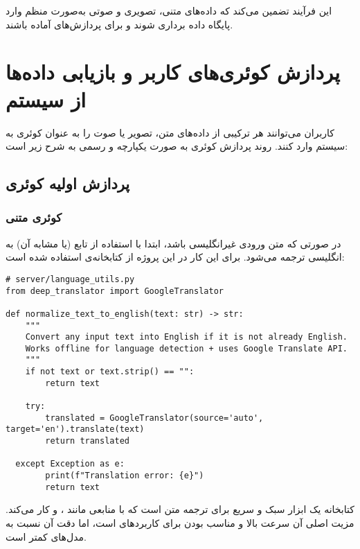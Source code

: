 \documentclass{article}
\begin{document}
این فرآیند تضمین می‌کند که داده‌های متنی، تصویری و صوتی به‌صورت منظم وارد پایگاه داده برداری شوند و برای پردازش‌های  آماده باشند.


\section{پردازش کوئری‌های کاربر و بازیابی داده‌ها از سیستم}

کاربران می‌توانند هر ترکیبی از داده‌های متن، تصویر یا صوت را به عنوان کوئری به سیستم وارد کنند.
روند پردازش کوئری به صورت یکپارچه و رسمی به شرح زیر است:

\subsection{پردازش اولیه کوئری}


\subsubsection{کوئری متنی}
در صورتی که متن ورودی غیرانگلیسی باشد، ابتدا با استفاده از تابع  (یا مشابه آن) به انگلیسی ترجمه می‌شود.
برای این کار در این پروژه از کتابخانه‌ی  استفاده شده است:

\begin{latin}
\begin{lstlisting}
# server/language_utils.py
from deep_translator import GoogleTranslator

def normalize_text_to_english(text: str) -> str:
    """
    Convert any input text into English if it is not already English.
    Works offline for language detection + uses Google Translate API.
    """
    if not text or text.strip() == "":
        return text

    try:
        translated = GoogleTranslator(source='auto', target='en').translate(text)
        return translated
  
  except Exception as e:
        print(f"Translation error: {e}")
        return text
\end{lstlisting}
\end{latin}

کتابخانه  یک ابزار سبک و سریع برای ترجمه متن است که با منابعی مانند ،  و  کار می‌کند.
مزیت اصلی آن سرعت بالا و مناسب بودن برای کاربردهای  است، اما دقت آن نسبت به مدل‌های  کمتر است.
\end{document}
